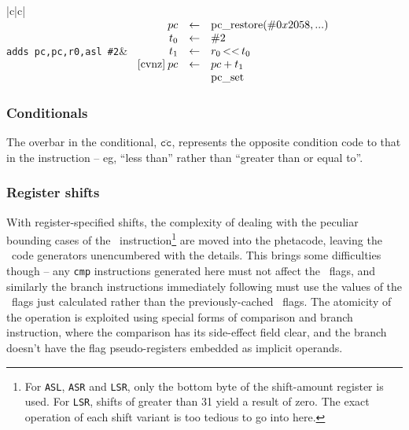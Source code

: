 \vspace{0.3cm}

{\centering \begin{tabular}{|c|c|}
\hline 
{}\\
\hline 
\hline 
{\tt adds pc,pc,r0,asl \#2}&
\( \begin{array}{rcl}
pc & \leftarrow & \mathop{\rm pc\_restore}(\#0x2058,...)\\
t_0 & \leftarrow & \#2\\
t_1 & \leftarrow & r_0 \mathop{\rm <<} t_0\\
\mathrm{[cvnz]}\: pc & \leftarrow & pc + t_1\\
 & & \mathop{\rm pc\_set}\\
\end{array} \)\\
\hline 
\end{tabular}\par}

\vspace{0.3cm}

\subsubsection{Conditionals}

The overbar in the conditional, $\overline{\mathtt{cc}}$, represents the opposite condition code to that in the instruction -- eg, ``less than'' rather than ``greater than or equal to''.

\subsubsection{Register shifts}

With register-specified shifts, the complexity of dealing with the peculiar bounding cases of the \arm\ instruction\footnote{For {\tt ASL}, {\tt ASR} and {\tt LSR}, only the bottom byte of the shift-amount register is used. For {\tt LSR}, shifts of greater than 31 yield a result of zero. The exact operation of each shift variant is too tedious to go into here.} are moved into the phetacode, leaving the \ia\ code generators unencumbered with the details. This brings some difficulties though -- any {\tt cmp} instructions generated here must not affect the \arm\ flags, and similarly the branch instructions immediately following must use the values of the \ia\ flags just calculated rather than the previously-cached \arm\ flags. The atomicity of the operation is exploited using special forms of comparison and branch instruction, where the comparison has its side-effect field clear, and the branch doesn't have the flag pseudo-registers embedded as implicit operands.

